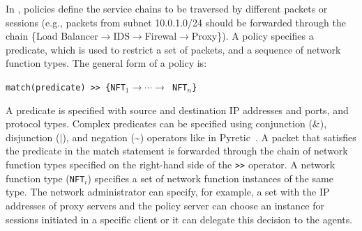 

In  \system,  policies define the service  chains  to be  traversed by
different packets  or sessions (e.g.,  packets from subnet 10.0.1.0/24
should    be     forwarded       through      the     chain     \{Load
Balancer$\rightarrow$IDS$\rightarrow$Firewal$\rightarrow$Proxy\}).   A
policy  specifies a  predicate,  which is  used  to restrict  a set of
packets, and a  sequence of network  function types.  The general form
of a policy is:
\begin{center}
{\tt match(predicate) >> \{NFT$_1 \rightarrow\cdots\rightarrow$ NFT$_n$\}}
\end{center}
A predicate is specified with source and  destination IP addresses and
ports, and protocol types.   Complex predicates can be specified using
conjunction (\&),  disjunction  ($|$),  and negation (\~{})  operators
like in Pyretic~\cite{pyretic}. A packet that satisfies  the predicate in the
match  statement is forwarded  through  the chain of network  function
types specified  on the right-hand side of  the  {\tt >>} operator.  A
network   function type ({\tt NFT$_i$})   specifies  a set of  network
function instances  of the same  type.  The network  administrator can
specify, for example, a set with the IP addresses of proxy servers and
the policy  server can choose an  instance for sessions initiated in a
specific  client or  it  can delegate   this  decision to  the \system
agents.



